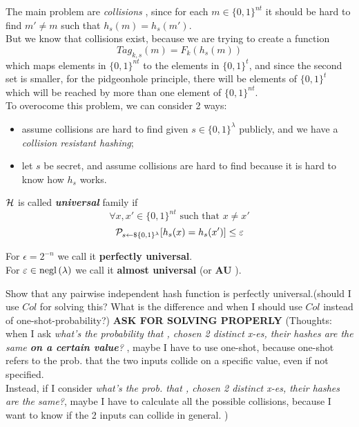 The main problem are \textit{collisions} , since for each $m \in \{0,1\}^{nt}$
it should be hard to find $m' \not= m$ such that $h_{s}(m)=h_{s}(m')$.\\
But we know that collisions exist, because we are trying to create a function 
\[
    Tag_{k, s}(m)=F_{k}(h_{s}(m))
\]
which maps elements in $\{0,1\}^{nt} $ to the elements in $\{0,1\}^{t}$, and
since the second set is smaller, for the pidgeonhole principle, there will be
 elements of $\{0,1\}^{t}$ which will be reached by more than one element of
$\{0,1\}^{nt}$.\\

To overocome this problem, we can consider 2 ways:
\begin{itemize}
    \item assume collisions are hard to find given $s \in \{0,1\}^{\lambda}$
        publicly, and we have a \textit{collision resistant hashing};
    \item let $s$ be secret, and assume collisions are hard to find because it
        is hard to know how $h_{s}$ works.
\end{itemize}
\begin{definition}
    $\H$ is called \textbf{ \textit{universal} } family if 
    \[
        \forall x, x' \in \{0,1\}^{nt} \text{ such that } x \not= x'
    \]
    \[
        \P_{s \leftarrow\$ \{0,1\}^{\lambda}} [ h_{s}(x)=h_{s}(x') ] \leq \epsilon  
    \]
\end{definition}
For $\epsilon=2^{-n}$ we call it \textbf{perfectly universal}.\\
For $\epsilon \in \negl{\lambda} $ we call it \textbf{almost universal} (or
\textbf{AU} ).\\

\begin{exercise}
    Show that any pairwise independent hash function is perfectly
    universal.(should I use $Col$ for solving this? What is the difference and
    when I should use $Col$ instead of one-shot-probability?) \textbf{ASK FOR
    SOLVING PROPERLY} (Thoughts: when I ask \textit{what's the probability that
, chosen 2 distinct x-es, their hashes are the same \textbf{on a certain value}?
}, maybe I have to use one-shot, because one-shot refers to the prob. that the
two inputs collide on a specific value, even if not specified.\\
Instead, if I consider \textit{what's the prob. that , chosen 2 distinct x-es,
their hashes are the same?}, maybe I have to calculate all the possible
collisions, because I want to know if the 2 inputs can collide in general. )
\end{exercise}

